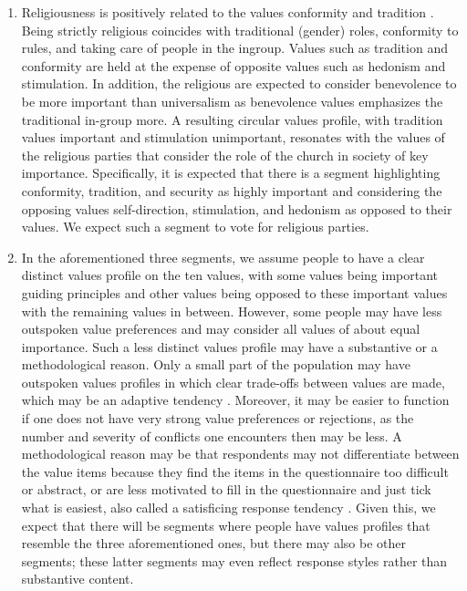 \documentclass[12pt,letter]{article}\usepackage[]{graphicx}\usepackage[]{xcolor}
\begin{document}
\begin{enumerate}
\item Religiousness is positively related to the values conformity and tradition \citep{schwartz1995}. Being strictly religious coincides with traditional (gender) roles, conformity to rules, and taking care of people in the ingroup. Values such as tradition and conformity are held at the expense of opposite values such as hedonism and stimulation. In addition, the religious are expected to consider benevolence to be more important than universalism as benevolence values emphasizes the traditional in-group more. A resulting circular values profile, with tradition values important and stimulation unimportant, resonates with the values of the religious parties that consider the role of the church in society of key importance. Specifically, it is expected that there is a segment highlighting conformity, tradition, and security as highly important and considering the opposing values self-direction, stimulation, and hedonism as opposed to their values. We expect such a segment to vote for religious parties.

\item In the aforementioned three segments, we assume people to have a clear distinct values profile on the ten values, with some values being important guiding principles and other values being opposed to these important values with the remaining values in between. However, some people may have less outspoken value preferences and may consider all values of about equal importance. Such a less distinct values profile may have a substantive or a methodological reason. Only a small part of the population  may have outspoken values profiles in which clear trade-offs between values are made, which may be an adaptive tendency \citep{borg2015}. Moreover, it may be easier to function if one does not have very strong value preferences or rejections, as the number and severity of conflicts one encounters then may be less. A methodological reason may be that respondents may not differentiate between the value items because they find the items in the questionnaire too difficult or abstract, or are less motivated to fill in the questionnaire and just tick what is easiest, also called a satisficing response tendency \citep{kaminska2010}. Given this, we expect that there will be segments where people have values profiles that resemble the three aforementioned ones, but there may also be other segments; these latter segments may even reflect response styles rather than substantive content. 

\end{enumerate}
\end{document}
